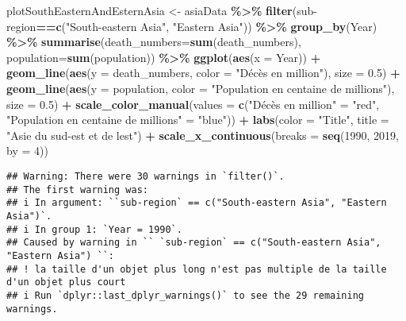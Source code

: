 \documentclass[
]{article}
\newenvironment{Shaded}{\begin{snugshade}}{\end{snugshade}}
\newcommand{\AttributeTok}[1]{\textcolor[rgb]{0.13,0.29,0.53}{#1}}
\newcommand{\DecValTok}[1]{\textcolor[rgb]{0.00,0.00,0.81}{#1}}
\newcommand{\FloatTok}[1]{\textcolor[rgb]{0.00,0.00,0.81}{#1}}
\newcommand{\FunctionTok}[1]{\textcolor[rgb]{0.13,0.29,0.53}{\textbf{#1}}}
\newcommand{\NormalTok}[1]{#1}
\newcommand{\OtherTok}[1]{\textcolor[rgb]{0.56,0.35,0.01}{#1}}
\newcommand{\SpecialCharTok}[1]{\textcolor[rgb]{0.81,0.36,0.00}{\textbf{#1}}}
\newcommand{\StringTok}[1]{\textcolor[rgb]{0.31,0.60,0.02}{#1}}
\begin{document}
\begin{Shaded}
\begin{Highlighting}[]
\NormalTok{plotSouthEasternAndEsternAsia }\OtherTok{\textless{}{-}}\NormalTok{ asiaData }\SpecialCharTok{\%\textgreater{}\%}
  \FunctionTok{filter}\NormalTok{(}\StringTok{\textasciigrave{}}\AttributeTok{sub{-}region}\StringTok{\textasciigrave{}}\SpecialCharTok{==}\FunctionTok{c}\NormalTok{(}\StringTok{"South{-}eastern Asia"}\NormalTok{, }\StringTok{"Eastern Asia"}\NormalTok{)) }\SpecialCharTok{\%\textgreater{}\%}
  \FunctionTok{group\_by}\NormalTok{(Year) }\SpecialCharTok{\%\textgreater{}\%}
  \FunctionTok{summarise}\NormalTok{(}\AttributeTok{death\_numbers=}\FunctionTok{sum}\NormalTok{(death\_numbers), }\AttributeTok{population=}\FunctionTok{sum}\NormalTok{(population)) }\SpecialCharTok{\%\textgreater{}\%}
  \FunctionTok{ggplot}\NormalTok{(}\FunctionTok{aes}\NormalTok{(}\AttributeTok{x =}\NormalTok{ Year)) }\SpecialCharTok{+} 
  \FunctionTok{geom\_line}\NormalTok{(}\FunctionTok{aes}\NormalTok{(}\AttributeTok{y =}\NormalTok{ death\_numbers, }\AttributeTok{color =} \StringTok{"Décès en million"}\NormalTok{), }\AttributeTok{size =} \FloatTok{0.5}\NormalTok{) }\SpecialCharTok{+}
  \FunctionTok{geom\_line}\NormalTok{(}\FunctionTok{aes}\NormalTok{(}\AttributeTok{y =}\NormalTok{ population, }\AttributeTok{color =} \StringTok{"Population en centaine de millions"}\NormalTok{), }\AttributeTok{size =} \FloatTok{0.5}\NormalTok{) }\SpecialCharTok{+}
  \FunctionTok{scale\_color\_manual}\NormalTok{(}\AttributeTok{values =} \FunctionTok{c}\NormalTok{(}\StringTok{"Décès en million"} \OtherTok{=} \StringTok{"red"}\NormalTok{, }\StringTok{"Population en centaine de millions"} \OtherTok{=} \StringTok{"blue"}\NormalTok{)) }\SpecialCharTok{+}
  \FunctionTok{labs}\NormalTok{(}\AttributeTok{color =} \StringTok{"Title"}\NormalTok{, }\AttributeTok{title =} \StringTok{"Asie du sud{-}est et de l\textquotesingle{}est"}\NormalTok{) }\SpecialCharTok{+}
  \FunctionTok{scale\_x\_continuous}\NormalTok{(}\AttributeTok{breaks =} \FunctionTok{seq}\NormalTok{(}\DecValTok{1990}\NormalTok{, }\DecValTok{2019}\NormalTok{, }\AttributeTok{by =} \DecValTok{4}\NormalTok{))}
\end{Highlighting}
\end{Shaded}

\begin{verbatim}
## Warning: There were 30 warnings in `filter()`.
## The first warning was:
## i In argument: ``sub-region` == c("South-eastern Asia", "Eastern Asia")`.
## i In group 1: `Year = 1990`.
## Caused by warning in `` `sub-region` == c("South-eastern Asia", "Eastern Asia") ``:
## ! la taille d'un objet plus long n'est pas multiple de la taille d'un objet plus court
## i Run `dplyr::last_dplyr_warnings()` to see the 29 remaining warnings.
\end{verbatim}
\end{document}

